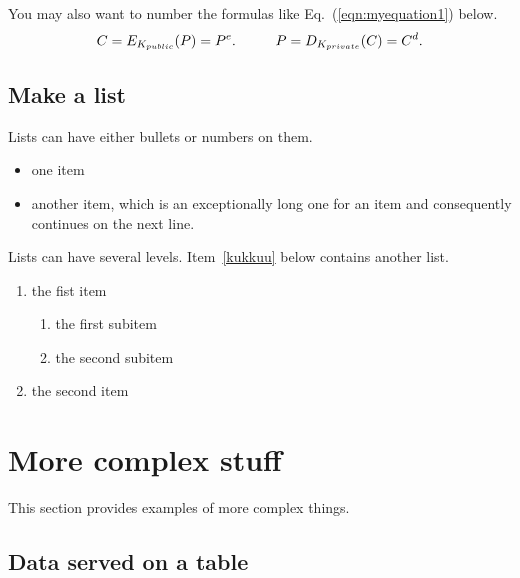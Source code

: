 \documentclass{cseminar}
\begin{document}
You may also want to number the formulas like Eq.~(\ref{eqn:myequation1})
below.
\begin{equation}\label{eqn:myequation1}
C = E_{K_{public}}(P) = P^e. \hspace{10mm}   P = D_{K_{private}}(C) = C^d.
\end{equation}





\subsection{Make a list}
\label{sec:list}

Lists can have either bullets or numbers on them. 

\begin{itemize}
\item one item
\item another item, which is an exceptionally long one for an item
  and consequently continues on the next line.
\end{itemize}

Lists can have several levels. Item~\ref{kukkuu} below contains
another list.
\begin{enumerate}
\item the fist item \label{kukkuu}
  \begin{enumerate}
  \item the first subitem 
  \item the second subitem
  \end{enumerate}
\item the second item
\end{enumerate}




\section{More complex stuff}

This section provides examples of more complex things.




\subsection{Data served on a table}
\end{document}
